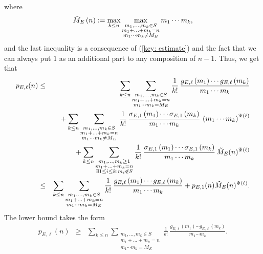 \documentclass[12pt]{amsart}
\theoremstyle{definition}
\theoremstyle{remark}
\numberwithin{theorem}{section} \numberwithin{equation}{section}
\begin{document}
 where
 \begin{equation*}\label{max:Tilde{M_E}}
\Tilde{M}_{E}\left( n\right) :=\max _{k\leq n}
\max _{\substack{m_1,\ldots,m_k \in S \\ m_{1}+\ldots +m_{k}=n \\ m_1\cdots m_k\not=M_E}}m_{1}\cdots m_{k},
\end{equation*}
and the last inequality is a consequence of (\ref{key: estimate}) and the fact that we can always put $1$ as an additional part to any composition of $n-1$. Thus, we get that
\begin{eqnarray*}
p_{E,\ell }(n) &\leq &
\sum _{k\leq n}\sum _{\substack{ m_1,\ldots,m_k\in S \\ m_{1}+\ldots +m_{k}=n  \\ m_1\cdots m_k=M_E}}
\frac{1}{k!} \, 
\frac{g_{E,\ell }\left( m_{1}\right) 
\cdots g_{E,\ell }\left( m_{k}\right) }{m_{1}\cdots m_{k}}\\
&
&{}+
\sum _{k\leq n}\sum _{\substack{m_1,\ldots,m_k\in S \\ m_{1}+\ldots +m_{k}=n \\ m_1\cdots m_k\not=M_E}}
\frac{1}{k!} \, 
\frac{\sigma_{E,1}\left( m_{1}\right) 
\cdots \sigma_{E,1}\left( m_{k}\right) }{m_{1}\cdots m_{k}}
\, \left(m_1 \cdots m_k\right)^{\Psi(\ell)}\\
&
&{}+
\sum _{k\leq n}\sum _{\substack{m_{1},\ldots ,m_{k} \geq 1 \\ m_{1}+\ldots +m_{k}=n \\ \exists 1\leq i\leq k: m_i\not\in S}}
\frac{1}{k!} \, 
\frac{\sigma_{E,1}\left( m_{1}\right) 
\cdots \sigma_{E,1}\left( m_{k}\right) }{m_1 \cdots m_k}
\, \Tilde{M}_E(n)^{\Psi(\ell)}\\
&\leq &
\sum _{k\leq n}\sum _{\substack{ m_1,\ldots,m_k\in S \\ m_{1}+\ldots +m_{k}=n  \\ m_1\cdots m_k=M_E}}
\frac{1}{k!} \, 
\frac{g_{E,\ell }\left( m_{1}\right) 
\cdots g_{E,\ell }\left( m_{k}\right) }{m_{1}\cdots m_{k}}+p_{E,1}(n)\Tilde{M}_E(n)^{\Psi(\ell)}.
\end{eqnarray*}
The lower bound takes the form
\begin{eqnarray*}
p_{E,\ell }(n) & \geq  & \sum _{k\leq n}\sum _{\substack{ m_1,\ldots,m_k\in S \\ m_{1}+\ldots +m_{k}=n  \\ m_1\cdots m_k=M_E}}
\frac{1}{k!} \, 
\frac{g_{E,\ell }\left( m_{1}\right) 
\cdots g_{E,\ell }\left( m_{k}\right) }{m_{1}\cdots m_{k}}.
\end{eqnarray*}
\end{document}
